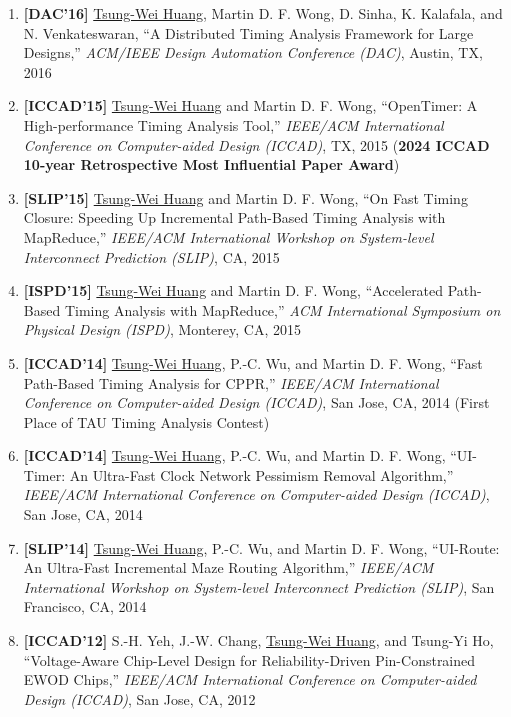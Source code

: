 \documentclass[A4,11pt]{article}
\begin{document}
\begin{enumerate}
    \item \textbf{[DAC'16]} \underline{Tsung-Wei Huang}, Martin D. F. Wong, D. Sinha, K. Kalafala, and N. Venkateswaran, ``A Distributed Timing Analysis Framework for Large Designs,'' \textit{ACM/IEEE Design Automation Conference (DAC)}, Austin, TX, 2016

    \item \textbf{[ICCAD'15]} \underline{Tsung-Wei Huang} and Martin D. F. Wong, ``OpenTimer: A High-performance Timing Analysis Tool,'' \textit{IEEE/ACM International Conference on Computer-aided Design (ICCAD)}, TX, 2015 (\textbf{2024 ICCAD 10-year Retrospective Most Influential Paper Award})

    \item \textbf{[SLIP'15]} \underline{Tsung-Wei Huang} and Martin D. F. Wong, ``On Fast Timing Closure: Speeding Up Incremental Path-Based Timing Analysis with MapReduce,'' \textit{IEEE/ACM International Workshop on System-level Interconnect Prediction (SLIP)}, CA, 2015

    \item \textbf{[ISPD'15]} \underline{Tsung-Wei Huang} and Martin D. F. Wong, ``Accelerated Path-Based Timing Analysis with MapReduce,'' \textit{ACM International Symposium on Physical Design (ISPD)}, Monterey, CA, 2015

    \item \textbf{[ICCAD'14]} \underline{Tsung-Wei Huang}, P.-C. Wu, and Martin D. F. Wong, ``Fast Path-Based Timing Analysis for CPPR,'' \textit{IEEE/ACM International Conference on Computer-aided Design (ICCAD)}, San Jose, CA, 2014 (First Place of TAU Timing Analysis Contest)

    \item \textbf{[ICCAD'14]} \underline{Tsung-Wei Huang}, P.-C. Wu, and Martin D. F. Wong, ``UI-Timer: An Ultra-Fast Clock Network Pessimism Removal Algorithm,'' \textit{IEEE/ACM International Conference on Computer-aided Design (ICCAD)}, San Jose, CA, 2014 

    \item \textbf{[SLIP'14]} \underline{Tsung-Wei Huang}, P.-C. Wu, and Martin D. F. Wong, ``UI-Route: An Ultra-Fast Incremental Maze Routing Algorithm,'' \textit{IEEE/ACM International Workshop on System-level Interconnect Prediction (SLIP)}, San Francisco, CA, 2014

    \item \textbf{[ICCAD'12]} S.-H. Yeh, J.-W. Chang, \underline{Tsung-Wei Huang}, and Tsung-Yi Ho, ``Voltage-Aware Chip-Level Design for Reliability-Driven Pin-Constrained EWOD Chips,'' \textit{IEEE/ACM International Conference on Computer-aided Design (ICCAD)}, San Jose, CA, 2012


\end{enumerate}
\end{document}
